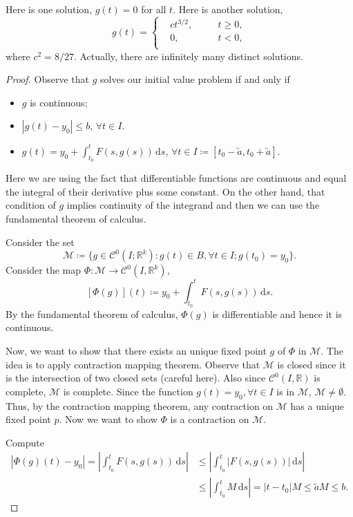 \documentclass[12pt]{article}
\theoremstyle{plain}
\theoremstyle{definition}
\begin{document}
    Here is one solution, $g(t)=0$ for all $t$.
    Here is another solution,
    \[
        g(t)=\left\{
            \begin{aligned}
                &ct^{3/2},\quad&&t\geq0,\\
                &0,&& t<0,\\
            \end{aligned}
        \right.
    \]
    where $c^2=8/27$.
    Actually, there are infinitely many distinct solutions.
\begin{proof}
    Observe that $g$ solves our initial value problem if and only if
    \begin{itemize}
        \item $g$ is continuous;
        \item $|g(t)-y_0|\leq b$, $\forall t\in I$.
        \item $g(t)=y_0+\int_{t_0}^t F(s,g(s))\,\mathrm{d}s$, $\forall t\in
        I\coloneqq[t_0-\tilde{a},t_0+\tilde{a}]$.
    \end{itemize}
    Here we are using the fact that differentiable functions are continuous and
    equal the integral of their derivative plus some constant.
    On the other hand, that condition of $g$ implies continuity of the integrand
    and then we can use the fundamental theorem of calculus.

    Consider the set
    $$\mathcal{M}\coloneqq\{g\in\mathcal{C}^0(I;\mathbb{R}^k):g(t)\in B,\forall t\in I;
    g(t_0)=y_0\}.$$
    Consider the map $\Phi:\mathcal{M}\rightarrow \mathcal{C}^0(I,\mathbb{R}^k)$,
    $$[\Phi(g)](t)\coloneqq y_0+\int_{t_0}^t F(s,g(s))\,\mathrm{d}s.$$
    By the fundamental theorem of calculus, $\Phi(g)$ is differentiable and
    hence it is continuous.

    Now, we want to show that there exists an unique fixed point $g$ of $\Phi$ in
    $\mathcal{M}$.
    The idea is to apply contraction mapping theorem.
    Observe that $\mathcal{M}$ is closed since it is the intersection of two
    closed sets (careful here).
    Also since $\mathcal{C}^0(I,\mathbb{R})$ is complete, $\mathcal{M}$ is
    complete.
    Since the function $g(t)=y_0, \forall t\in I$ is in $\mathcal{M}$,
    $\mathcal{M}\neq\emptyset$.
    Thus, by the contraction mapping theorem, any contraction on $\mathcal{M}$
    has a unique fixed point $p$.
    Now we want to show $\Phi$ is a contraction on $\mathcal{M}$.

    Compute 
    $$\begin{aligned}
        |\Phi(g)(t)-y_0|=\left|\int_{t_0}^tF(s,g(s))\,\mathrm{d}s\right|
        &\leq \left|\int_{t_0}^t |F(s,g(s))|\,\mathrm{d}s\right|\\
        &\leq \left|\int_{t_0}^t M\,\mathrm{d}s\right|=|t-t_0|M\leq\tilde{a} M\leq b.
    \end{aligned}$$


\end{proof}
\end{document}
